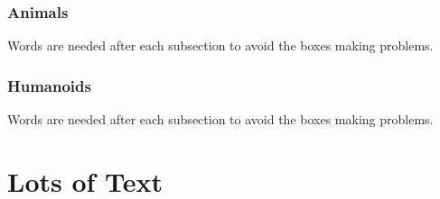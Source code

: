 \documentclass[a4paper,openany]{book}
\begin{document}
\begin{multicols}{2}

\subsection{Animals}
Words are needed after each subsection to avoid the boxes making problems.



\morphhorse

\morphcat

\morphslug

\morphspider

\morphwolf

\subsection{Humanoids}
Words are needed after each subsection to avoid the boxes making problems.



\goblin

\goblincaster

\hobgoblin

\ogre

\end{multicols}


\chapter{Lots of Text}

\begin{multicols}{2}

\noindent
\lipsum

\end{multicols}
\end{document}
